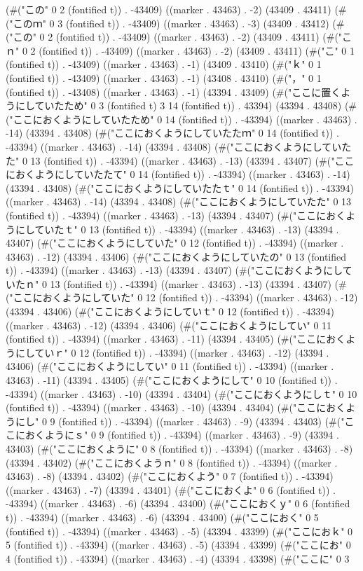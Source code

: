 (#("この" 0 2 (fontified t)) . -43409) ((marker . 43463) . -2) (43409 . 43411) (#("このｍ" 0 3 (fontified t)) . -43409) ((marker . 43463) . -3) (43409 . 43412) (#("この" 0 2 (fontified t)) . -43409) ((marker . 43463) . -2) (43409 . 43411) (#("こｎ" 0 2 (fontified t)) . -43409) ((marker . 43463) . -2) (43409 . 43411) (#("こ" 0 1 (fontified t)) . -43409) ((marker . 43463) . -1) (43409 . 43410) (#("ｋ" 0 1 (fontified t)) . -43409) ((marker . 43463) . -1) (43408 . 43410) (#("，" 0 1 (fontified t)) . -43408) ((marker . 43463) . -1) (43394 . 43409) (#("ここに置くようにしていたため" 0 3 (fontified t) 3 14 (fontified t)) . 43394) (43394 . 43408) (#("ここにおくようにしていたため" 0 14 (fontified t)) . -43394) ((marker . 43463) . -14) (43394 . 43408) (#("ここにおくようにしていたたｍ" 0 14 (fontified t)) . -43394) ((marker . 43463) . -14) (43394 . 43408) (#("ここにおくようにしていたた" 0 13 (fontified t)) . -43394) ((marker . 43463) . -13) (43394 . 43407) (#("ここにおくようにしていたたて" 0 14 (fontified t)) . -43394) ((marker . 43463) . -14) (43394 . 43408) (#("ここにおくようにしていたたｔ" 0 14 (fontified t)) . -43394) ((marker . 43463) . -14) (43394 . 43408) (#("ここにおくようにしていたた" 0 13 (fontified t)) . -43394) ((marker . 43463) . -13) (43394 . 43407) (#("ここにおくようにしていたｔ" 0 13 (fontified t)) . -43394) ((marker . 43463) . -13) (43394 . 43407) (#("ここにおくようにしていた" 0 12 (fontified t)) . -43394) ((marker . 43463) . -12) (43394 . 43406) (#("ここにおくようにしていたの" 0 13 (fontified t)) . -43394) ((marker . 43463) . -13) (43394 . 43407) (#("ここにおくようにしていたｎ" 0 13 (fontified t)) . -43394) ((marker . 43463) . -13) (43394 . 43407) (#("ここにおくようにしていた" 0 12 (fontified t)) . -43394) ((marker . 43463) . -12) (43394 . 43406) (#("ここにおくようにしていｔ" 0 12 (fontified t)) . -43394) ((marker . 43463) . -12) (43394 . 43406) (#("ここにおくようにしてい" 0 11 (fontified t)) . -43394) ((marker . 43463) . -11) (43394 . 43405) (#("ここにおくようにしていｒ" 0 12 (fontified t)) . -43394) ((marker . 43463) . -12) (43394 . 43406) (#("ここにおくようにしてい" 0 11 (fontified t)) . -43394) ((marker . 43463) . -11) (43394 . 43405) (#("ここにおくようにして" 0 10 (fontified t)) . -43394) ((marker . 43463) . -10) (43394 . 43404) (#("ここにおくようにしｔ" 0 10 (fontified t)) . -43394) ((marker . 43463) . -10) (43394 . 43404) (#("ここにおくようにし" 0 9 (fontified t)) . -43394) ((marker . 43463) . -9) (43394 . 43403) (#("ここにおくようにｓ" 0 9 (fontified t)) . -43394) ((marker . 43463) . -9) (43394 . 43403) (#("ここにおくように" 0 8 (fontified t)) . -43394) ((marker . 43463) . -8) (43394 . 43402) (#("ここにおくようｎ" 0 8 (fontified t)) . -43394) ((marker . 43463) . -8) (43394 . 43402) (#("ここにおくよう" 0 7 (fontified t)) . -43394) ((marker . 43463) . -7) (43394 . 43401) (#("ここにおくよ" 0 6 (fontified t)) . -43394) ((marker . 43463) . -6) (43394 . 43400) (#("ここにおくｙ" 0 6 (fontified t)) . -43394) ((marker . 43463) . -6) (43394 . 43400) (#("ここにおく" 0 5 (fontified t)) . -43394) ((marker . 43463) . -5) (43394 . 43399) (#("ここにおｋ" 0 5 (fontified t)) . -43394) ((marker . 43463) . -5) (43394 . 43399) (#("ここにお" 0 4 (fontified t)) . -43394) ((marker . 43463) . -4) (43394 . 43398) (#("ここに" 0 3 